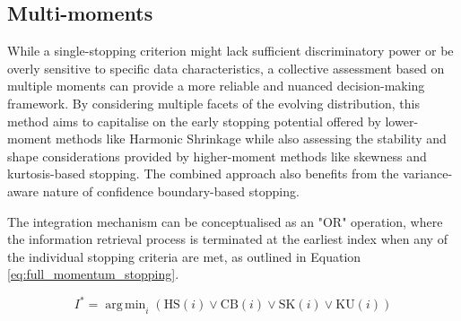 \documentclass[sigconf,natbib=true,anonymous=true]{acmart}
\DeclareMathOperator*{\argmin}{arg\,min}
\begin{document}
\subsection{Multi-moments}
While a single-stopping criterion might lack sufficient discriminatory power or be overly sensitive to specific data characteristics, a collective assessment based on multiple moments can provide a more reliable and nuanced decision-making framework. By considering multiple facets of the evolving distribution, this method aims to capitalise on the early stopping potential offered by lower-moment methods like Harmonic Shrinkage while also assessing the stability and shape considerations provided by higher-moment methods like skewness and kurtosis-based stopping. The combined approach also benefits from the variance-aware nature of confidence boundary-based stopping.

The integration mechanism can be conceptualised as an "OR" operation, where the information retrieval process is terminated at the earliest index when any of the individual stopping criteria are met, as outlined in Equation \ref{eq:full_momentum_stopping}.

\begin{equation}
\label{eq:full_momentum_stopping}
I^* = \argmin_{i} \left( \text{HS}(i) \lor \text{CB}(i) \lor \text{SK}(i) \lor \text{KU}(i) \right)
\end{equation}

    


\end{document}
